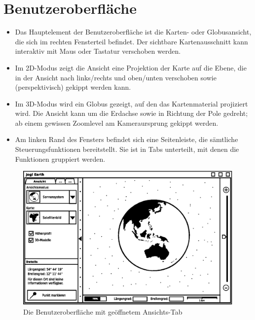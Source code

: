 
\chapter{Benutzeroberfläche}
\begin{itemize}
\item Das Hauptelement der Benutzeroberfläche ist die Karten- oder Globusansicht, die sich im rechten Fensterteil befindet. Der sichtbare Kartenausschnitt kann interaktiv mit Maus oder Tastatur verschoben werden.
\item Im 2D-Modus zeigt die Ansicht eine Projektion der Karte auf die Ebene, die in der Ansicht nach links/rechts und oben/unten verschoben sowie (perspektivisch) gekippt werden kann.
\item Im 3D-Modus wird ein Globus gezeigt, auf den das Kartenmaterial projiziert wird. Die Ansicht kann um die Erdachse sowie in Richtung der Pole gedreht; ab einem gewissen Zoomlevel am Kameraursprung gekippt werden.
\item Am linken Rand des Fensters befindet sich eine Seitenleiste, die sämtliche Steuerungsfunktionen bereitstellt. Sie ist in Tabs unterteilt, mit denen die Funktionen gruppiert werden.
\end{itemize}
\begin{figure}
	\centering
\includegraphics[scale=0.9]{GUI-Ansicht.eps}
	\caption{Die Benutzeroberfläche mit geöffnetem Ansichts-Tab}
\end{figure}

